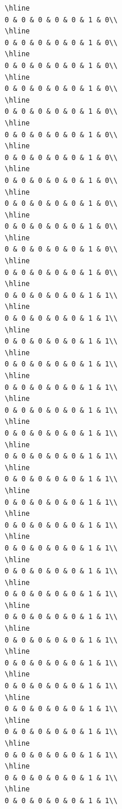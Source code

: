 \documentclass[
]{article}
\begin{document}
\begin{verbatim}
\hline
0 & 0 & 0 & 0 & 0 & 1 & 0\\
\hline
0 & 0 & 0 & 0 & 0 & 1 & 0\\
\hline
0 & 0 & 0 & 0 & 0 & 1 & 0\\
\hline
0 & 0 & 0 & 0 & 0 & 1 & 0\\
\hline
0 & 0 & 0 & 0 & 0 & 1 & 0\\
\hline
0 & 0 & 0 & 0 & 0 & 1 & 0\\
\hline
0 & 0 & 0 & 0 & 0 & 1 & 0\\
\hline
0 & 0 & 0 & 0 & 0 & 1 & 0\\
\hline
0 & 0 & 0 & 0 & 0 & 1 & 0\\
\hline
0 & 0 & 0 & 0 & 0 & 1 & 0\\
\hline
0 & 0 & 0 & 0 & 0 & 1 & 0\\
\hline
0 & 0 & 0 & 0 & 0 & 1 & 0\\
\hline
0 & 0 & 0 & 0 & 0 & 1 & 1\\
\hline
0 & 0 & 0 & 0 & 0 & 1 & 1\\
\hline
0 & 0 & 0 & 0 & 0 & 1 & 1\\
\hline
0 & 0 & 0 & 0 & 0 & 1 & 1\\
\hline
0 & 0 & 0 & 0 & 0 & 1 & 1\\
\hline
0 & 0 & 0 & 0 & 0 & 1 & 1\\
\hline
0 & 0 & 0 & 0 & 0 & 1 & 1\\
\hline
0 & 0 & 0 & 0 & 0 & 1 & 1\\
\hline
0 & 0 & 0 & 0 & 0 & 1 & 1\\
\hline
0 & 0 & 0 & 0 & 0 & 1 & 1\\
\hline
0 & 0 & 0 & 0 & 0 & 1 & 1\\
\hline
0 & 0 & 0 & 0 & 0 & 1 & 1\\
\hline
0 & 0 & 0 & 0 & 0 & 1 & 1\\
\hline
0 & 0 & 0 & 0 & 0 & 1 & 1\\
\hline
0 & 0 & 0 & 0 & 0 & 1 & 1\\
\hline
0 & 0 & 0 & 0 & 0 & 1 & 1\\
\hline
0 & 0 & 0 & 0 & 0 & 1 & 1\\
\hline
0 & 0 & 0 & 0 & 0 & 1 & 1\\
\hline
0 & 0 & 0 & 0 & 0 & 1 & 1\\
\hline
0 & 0 & 0 & 0 & 0 & 1 & 1\\
\hline
0 & 0 & 0 & 0 & 0 & 1 & 1\\
\hline
0 & 0 & 0 & 0 & 0 & 1 & 1\\
\hline
0 & 0 & 0 & 0 & 0 & 1 & 1\\

\end{verbatim}
\end{document}

